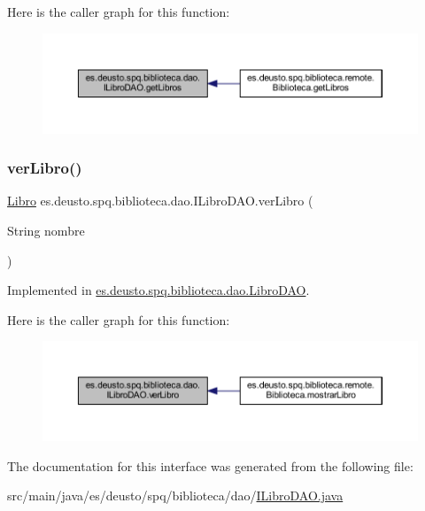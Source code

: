 Here is the caller graph for this function\+:
\nopagebreak
\begin{figure}[H]
\begin{center}
\leavevmode
\includegraphics[width=350pt]{interfacees_1_1deusto_1_1spq_1_1biblioteca_1_1dao_1_1_i_libro_d_a_o_ad8d7e48cb052174072938ca00ace7fea_icgraph}
\end{center}
\end{figure}
\mbox{\label{interfacees_1_1deusto_1_1spq_1_1biblioteca_1_1dao_1_1_i_libro_d_a_o_ae390d687e8e4ec02a401291da5076062}} 
\subsubsection{\texorpdfstring{ver\+Libro()}{verLibro()}}
{\footnotesize\ttfamily \mbox{\hyperlink{classes_1_1deusto_1_1spq_1_1biblioteca_1_1data_1_1_libro}{Libro}} es.\+deusto.\+spq.\+biblioteca.\+dao.\+I\+Libro\+D\+A\+O.\+ver\+Libro (\begin{DoxyParamCaption}\item[{String}]{nombre }\end{DoxyParamCaption})}



Implemented in \mbox{\hyperlink{classes_1_1deusto_1_1spq_1_1biblioteca_1_1dao_1_1_libro_d_a_o_a8138eaa485efda1fa97a158f460301dd}{es.\+deusto.\+spq.\+biblioteca.\+dao.\+Libro\+D\+AO}}.

Here is the caller graph for this function\+:
\nopagebreak
\begin{figure}[H]
\begin{center}
\leavevmode
\includegraphics[width=350pt]{interfacees_1_1deusto_1_1spq_1_1biblioteca_1_1dao_1_1_i_libro_d_a_o_ae390d687e8e4ec02a401291da5076062_icgraph}
\end{center}
\end{figure}


The documentation for this interface was generated from the following file\+:\begin{DoxyCompactItemize}
\item 
src/main/java/es/deusto/spq/biblioteca/dao/\mbox{\hyperlink{_i_libro_d_a_o_8java}{I\+Libro\+D\+A\+O.\+java}}\end{DoxyCompactItemize}
